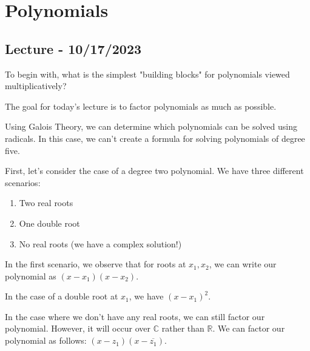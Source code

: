\documentclass[openany]{book}
\newcommand{\CC}{\mathbb{C}}
\newcommand{\RR}{\mathbb{R}}
\begin{document}
\chapter{Polynomials}
\section{Lecture - 10/17/2023}
To begin with, what is the simplest "building blocks" for polynomials viewed multiplicatively?

The goal for today's lecture is to factor polynomials as much as possible.

\begin{rmk}
	Using Galois Theory, we can determine which polynomials can be solved using radicals. In this case, we can't create a formula for solving polynomials of degree five.
\end{rmk}

First, let's consider the case of a degree two polynomial. We have three different scenarios:
\begin{enumerate}
	\item Two real roots
	\item One double root
	\item No real roots (we have a complex solution!)
\end{enumerate}

In the first scenario, we observe that for roots at $x_{1}, x_{2}$, we can write our polynomial as $(x-x_{1})(x-x_{2})$.

In the case of a double root at $x_{1}$, we have $(x-x_{1})^{2}$.

In the case where we don't have any real roots, we can still factor our polynomial. However, it will occur over $\CC$ rather than $\RR$. We can factor our polynomial as follows: $(x-z_{1})(x-\overline{z_{1}})$.
\end{document}
